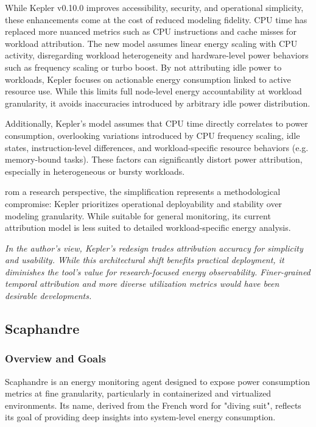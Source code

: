 While Kepler v0.10.0 improves accessibility, security, and operational simplicity, these enhancements come at the cost of reduced modeling fidelity. CPU time has replaced more nuanced metrics such as CPU instructions and cache misses for workload attribution. The new model assumes linear energy scaling with CPU activity, disregarding workload heterogeneity and hardware-level power behaviors such as frequency scaling or turbo boost. By not attributing idle power to workloads, Kepler focuses on actionable energy consumption linked to active resource use. While this limits full node-level energy accountability at workload granularity, it avoids inaccuracies introduced by arbitrary idle power distribution.

Additionally, Kepler's model assumes that CPU time directly correlates to power consumption, overlooking variations introduced by CPU frequency scaling, idle states, instruction-level differences, and workload-specific resource behaviors (e.g. memory-bound tasks). These factors can significantly distort power attribution, especially in heterogeneous or bursty workloads.

rom a research perspective, the simplification represents a methodological compromise: Kepler prioritizes operational deployability and stability over modeling granularity. While suitable for general monitoring, its current attribution model is less suited to detailed workload-specific energy analysis.

\textit{In the author's view, Kepler's redesign trades attribution accuracy for simplicity and usability. While this architectural shift benefits practical deployment, it diminishes the tool's value for research-focused energy observability. Finer-grained temporal attribution and more diverse utilization metrics would have been desirable developments.}

\subsection{Scaphandre}
\label{sec:scaphandre}

\subsubsection{Overview and Goals}
\label{sec:scaphandre-overview}

Scaphandre\parencite{scaphandre_github} is an energy monitoring agent designed to expose power consumption metrics at fine granularity, particularly in containerized and virtualized environments. Its name, derived from the French word for "diving suit", reflects its goal of providing deep insights into system-level energy consumption.

